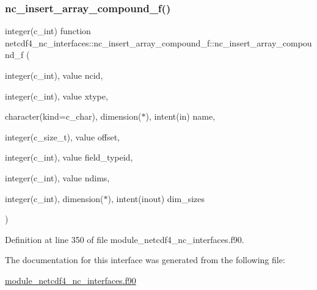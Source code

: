 \subsubsection{\texorpdfstring{nc\+\_\+insert\+\_\+array\+\_\+compound\+\_\+f()}{nc\_insert\_array\_compound\_f()}}
{\footnotesize\ttfamily integer(c\+\_\+int) function netcdf4\+\_\+nc\+\_\+interfaces\+::nc\+\_\+insert\+\_\+array\+\_\+compound\+\_\+f\+::nc\+\_\+insert\+\_\+array\+\_\+compound\+\_\+f (\begin{DoxyParamCaption}\item[{integer(c\+\_\+int), value}]{ncid,  }\item[{integer(c\+\_\+int), value}]{xtype,  }\item[{character(kind=c\+\_\+char), dimension($\ast$), intent(in)}]{name,  }\item[{integer(c\+\_\+size\+\_\+t), value}]{offset,  }\item[{integer(c\+\_\+int), value}]{field\+\_\+typeid,  }\item[{integer(c\+\_\+int), value}]{ndims,  }\item[{integer(c\+\_\+int), dimension($\ast$), intent(inout)}]{dim\+\_\+sizes }\end{DoxyParamCaption})}



Definition at line 350 of file module\+\_\+netcdf4\+\_\+nc\+\_\+interfaces.\+f90.



The documentation for this interface was generated from the following file\+:\begin{DoxyCompactItemize}
\item 
\hyperlink{module__netcdf4__nc__interfaces_8f90}{module\+\_\+netcdf4\+\_\+nc\+\_\+interfaces.\+f90}\end{DoxyCompactItemize}
